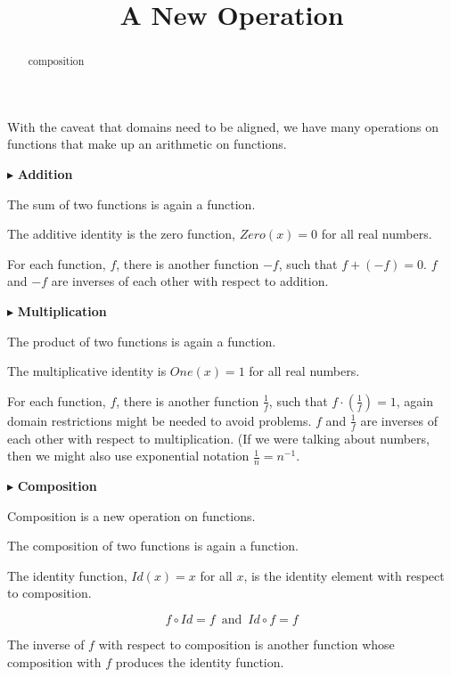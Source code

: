 \documentclass{ximera}
\title{A New Operation}
\begin{document}
\begin{abstract}
composition
\end{abstract}
\maketitle





With the caveat that domains need to be aligned, we have many operations on functions that make up an arithmetic on functions. 




$\blacktriangleright$ \textbf{\textcolor{blue!75!black}{Addition}}  

The sum of two functions is again a function. 

The additive identity is the zero function, $Zero(x) = 0$ for all real numbers.

For each function, $f$, there is another function $-f$, such that $f + (-f) = 0$.   $f$ and $-f$ are inverses of each other with respect to addition.




$\blacktriangleright$ \textbf{\textcolor{blue!75!black}{Multiplication}} 

The product of two functions is again a function.  

The multiplicative identity is $One(x) = 1$ for all real numbers.

For each function, $f$, there is another function $\frac{1}{f}$, such that $f \cdot \left( \frac{1}{f} \right) = 1$, again domain restrictions might be needed to avoid problems.   $f$ and $\frac{1}{f}$ are inverses of each other with respect to multiplication.  (If we were talking about numbers, then we might also use exponential notation $\frac{1}{n} = n^{-1}$.


$\blacktriangleright$ \textbf{\textcolor{blue!75!black}{Composition}} 

Composition is a new operation on functions.

The composition of two functions is again a function. 

The identity function, $Id(x) = x$ for all $x$, is the identity element with respect to composition.



\[   f \circ Id = f    \, \text{ and } \, Id \circ f = f        \]



The inverse of $f$ with respect to composition is another function whose composition with $f$ produces the identity function.
\end{document}

